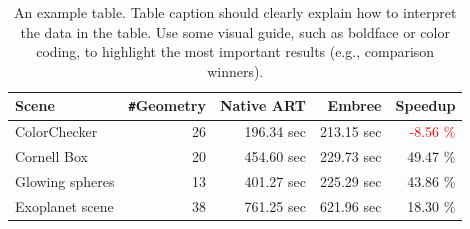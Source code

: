 \begin{table}
	\centering
	{\footnotesize\sf
		\begin{tabular}{lrrrr}
			\toprule
			Scene & \Verb!#!Geometry & Native ART & Embree & Speedup \\ 
			\midrule
			ColorChecker & 26 & 196.34 sec & 213.15 sec & \textcolor{red}{-8.56 \%} \\
			Cornell Box & 20 & 454.60 sec & 229.73 sec & 49.47 \% \\
			Glowing spheres & 13 & 401.27 sec & 225.29 sec & 43.86 \%  \\
			Exoplanet scene & 38 & 761.25 sec & 621.96 sec & 18.30 \% \\
			\bottomrule
	\end{tabular}}
	\caption{An example table. Table caption should clearly explain how to interpret the data in the table. Use some visual guide, such as boldface or color coding, to highlight the most important results (e.g., comparison winners).}
	\label{tab:scenes}
\end{table}


